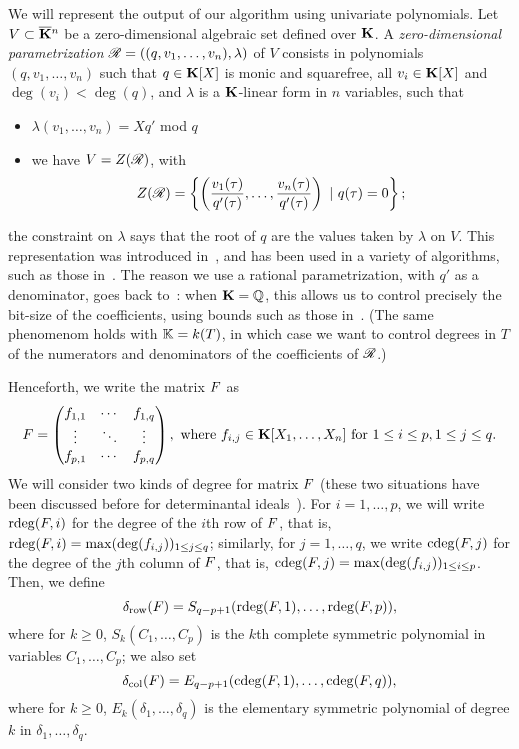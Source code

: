 \documentclass[12pt]{article}
\begin{document}
We will represent the output of our algorithm using univariate
polynomials. Let $V \subset \overline{\mathbf{K}}{}^n$ be a zero-dimensional algebraic
set defined over $\mathbf{K}$. A \emph{zero-dimensional parametrization}
$\mathscr{R} = ((q,v_1, \ldots, v_n), \lambda)$ of $V$ consists in
polynomials $(q,v_1, \ldots, v_n)$ such that $q \in \mathbf{K}[X]$ is monic
and squarefree, all $v_i \in \mathbf{K}[X]$ and $\deg(v_i) < \deg(q)$, and
$\lambda$ is a $\mathbf{K}$-linear form in $n$ variables, such that
\begin{itemize}
\item $\lambda(v_1, \ldots, v_n) = Xq'$ mod $q$
\item we have $V = Z(\mathscr{R})$, with $$Z(\mathscr{R})= \left\{\left(\frac{v_1(\tau)}{q'(\tau)}, \ldots, \frac{v_n(\tau)}{q'(\tau)}\right) \ | \ q(\tau) = 0\right\};$$
\end{itemize}
the constraint on $\lambda$ says that the root of $q$ are the values
taken by $\lambda$ on $V$. This representation was introduced
in~\cite{Kronecker82,Macaulay16}, and has been used in a variety of
algorithms, such
as those in~\cite{GiMo89,GiHeMoPa95,ABRW,GiHeMoMoPa98,Rouillier99,GiLeSa01}.
The reason we use a rational parametrization, with $q'$ as a
denominator, goes back to~\cite{ABRW, Rouillier99, GiLeSa01}: when
$\mathbf{K}=\mathbb{Q}$, this allows us to control precisely the bit-size of the
coefficients, using bounds such as those
in~\cite{Schost03,DaSc04}. (The same phenomenom holds with $\mathbb{K}=k(T)$,
in which case we want to control degrees in $T$ of the numerators and
denominators of the coefficients of $\mathscr{R}$.)


Henceforth, we write the matrix ${F}$ as 
\[ {F} = 
\left( \begin{matrix}
f_{1,1} & \cdots & f_{1,q}\\
\vdots & \ddots & \vdots \\
f_{p,1} & \cdots & f_{p,q}
\end{matrix} \right), \ \mathrm{where} \ f_{i,j} \in \mathbf{K}[X_1,\dots,X_n] \ \mathrm{for} \ 1 \leq i \leq p, 1 \leq j \leq q.
\]
We will consider two kinds of degree for matrix ${F}$ (these two
situations have been discussed before for determinantal
ideals~\cite{NieRan09,MiSt04}). For $i=1,\dots,p$, we will write $\mathrm{rdeg}({F},i)$ for the
degree of the $i$th row of ${F}$, that is,
$\mathrm{rdeg}({F},i)=\max(\deg(f_{i,j}))_{1 \le j \le q}$; similarly, for $j=1,\dots,q$, we write
$\mathrm{cdeg}({F},j)$ for the degree of the $j$th column of ${F}$, that is,
$\mathrm{cdeg}({F},j)=\max(\deg(f_{i,j}))_{1 \le i \le p}$. Then, we define
$$\delta_{\rm row}({F}) = S_{q-p+1}(\mathrm{rdeg}({F},1), \ldots, \mathrm{rdeg}({F},p)),$$
where for $k\ge 0$, $S_k(C_1,\dots,C_p)$ is the $k$th complete symmetric
polynomial in variables $C_1,\dots,C_p$; we also set 
$$\delta_{\rm col}({F}) = E_{q-p+1}(\mathrm{cdeg}({F},1), \ldots, \mathrm{cdeg}({F},q)),$$
where for $k \ge 0$, $E_k(\delta_1,\dots,\delta_q)$ is the 
elementary symmetric polynomial of degree $k$ in $\delta_1, \ldots, \delta_q$.
\end{document}
